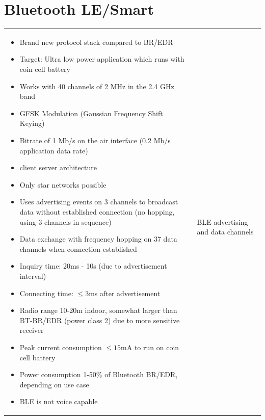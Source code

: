 \section{Bluetooth LE/Smart}
	\begin{tabular}{ll}
		\parbox{10cm}{
			\begin{itemize}
				\item Brand new protocol stack compared to BR/EDR
				\item Target: Ultra low power application which runs with coin cell battery
				\item Works with 40 channels of 2 MHz in the 2.4 GHz band
				\item GFSK Modulation (Gaussian Frequency Shift Keying)
				\item Bitrate of 1 Mb/s on the air interface (0.2 Mb/s application data rate)
				\item client server architecture
				\item Only star networks possible
				\item Uses advertising events on 3 channels to broadcast data without established connection (no hopping, using 3 channels in sequence)
				\item Data exchange with frequency hopping on 37 data channels when connection established
				\item Inquiry time: 20ms - 10s (due to advertisement interval)
				\item Connecting time: $\leq 3$ms after advertisement
				\item Radio range 10-20m indoor, somewhat larger than BT-BR/EDR (power class 2) due to more sensitive receiver
				\item Peak current consumption $\leq 15$mA to run on coin cell battery
				\item Power consumption 1-50\% of Bluetooth BR/EDR, depending on use case
				\item BLE is not voice capable
			\end{itemize}

		}	
		& \parbox{8cm}{
			 \\ BLE advertising and data channels }
	\end{tabular}
	
